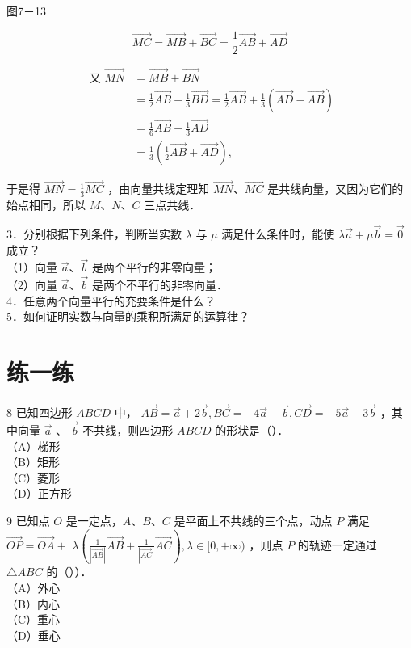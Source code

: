\documentclass[10pt]{article}
\begin{document}
图7－13

\[
\overrightarrow{M C}=\overrightarrow{M B}+\overrightarrow{B C}=\frac{1}{2} \overrightarrow{A B}+\overrightarrow{A D}
\]

\[
\begin{aligned}
\text { 又 } \overrightarrow{M N} & =\overrightarrow{M B}+\overrightarrow{B N} \\
& =\frac{1}{2} \overrightarrow{A B}+\frac{1}{3} \overrightarrow{B D}=\frac{1}{2} \overrightarrow{A B}+\frac{1}{3}(\overrightarrow{A D}-\overrightarrow{A B}) \\
& =\frac{1}{6} \overrightarrow{A B}+\frac{1}{3} \overrightarrow{A D} \\
& =\frac{1}{3}\left(\frac{1}{2} \overrightarrow{A B}+\overrightarrow{A D}\right),
\end{aligned}
\]

于是得 \(\overrightarrow{M N}=\frac{1}{3} \overrightarrow{M C}\) ，由向量共线定理知 \(\overrightarrow{M N} 、 \overrightarrow{M C}\) 是共线向量，又因为它们的始点相同，所以 \(M 、 N 、 C\) 三点共线．

3．分别根据下列条件，判断当实数 \(\lambda\) 与 \(\mu\) 满足什么条件时，能使 \(\lambda \vec{a}+\mu \vec{b}=\overrightarrow{0}\) 成立？\\
（1）向量 \(\vec{a} 、 \vec{b}\) 是两个平行的非零向量；\\
（2）向量 \(\vec{a} 、 \vec{b}\) 是两个不平行的非零向量．\\
4．任意两个向量平行的充要条件是什么？\\
5．如何证明实数与向量的乘积所满足的运算律？

\section*{练一练}
8 已知四边形 \(A B C D\) 中， \(\overrightarrow{A B}=\vec{a}+2 \vec{b}, \overrightarrow{B C}=-4 \vec{a}-\vec{b}, \overrightarrow{C D}=-5 \vec{a}-3 \vec{b}\) ，其中向量 \(\vec{a}\) 、 \(\vec{b}\) 不共线，则四边形 \(A B C D\) 的形状是（）．\\
（A）梯形\\
（B）矩形\\
（C）菱形\\
（D）正方形

9 已知点 \(O\) 是一定点，\(A 、 B 、 C\) 是平面上不共线的三个点，动点 \(P\) 满足 \(\overrightarrow{O P}=\overrightarrow{O A}+\) \(\lambda\left(\frac{1}{|\overrightarrow{A B}|} \overrightarrow{A B}+\frac{1}{|\overrightarrow{A C}|} \overrightarrow{A C}\right), \lambda \in[0,+\infty)\) ，则点 \(P\) 的轨迹一定通过 \(\triangle A B C\) 的（））．\\
（A）外心\\
（B）内心\\
（C）重心\\
（D）垂心
\end{document}
